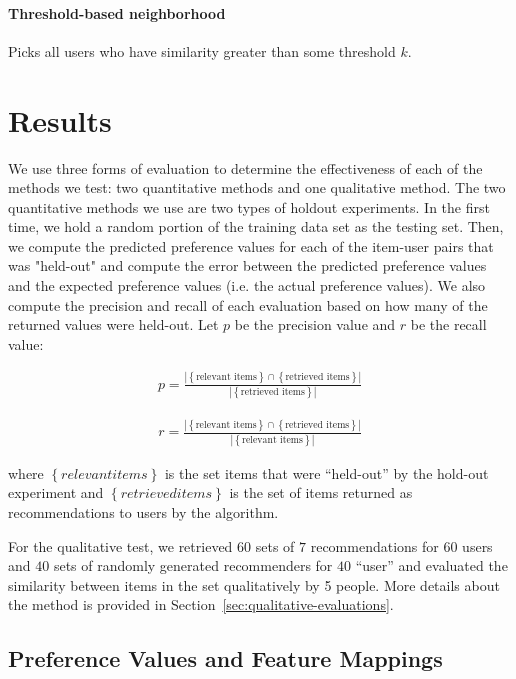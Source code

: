 \documentclass{article}
\begin{document}
\paragraph{Threshold-based neighborhood} Picks all users who have similarity greater than some threshold $k$. 

\section{Results}\label{sec:results}

We use three forms of evaluation to determine the effectiveness of each of the methods we test: two quantitative
methods and one qualitative method. The two quantitative methods we use are two types of holdout experiments.
In the first time, we hold a random portion of the training data set as the testing set. Then, we compute the 
predicted preference values for each of the item-user pairs that was "held-out" and compute the error between
the predicted preference values and the expected preference values (i.e. the actual preference values). We
also compute the precision and recall of each evaluation based on how many of the returned values
were held-out. Let $p$ be the precision value and $r$ be the recall value:

\begin{align*}
p = \frac{|\left\{ \text{relevant items} \right\} \cap \left\{\text{retrieved items}\right\}|}{|\left\{\text{retrieved items}\right\}|}
\end{align*}

\begin{align*}
r = \frac{|\left\{ \text{relevant items} \right\} \cap \left\{\text{retrieved items}\right\}|}{|\left\{\text{relevant items}\right\}|}
\end{align*} 

where $\left\{relevant items\right\}$ is the set items that were ``held-out'' by the hold-out experiment and $\left\{retrieved items\right\}$ is the set of items returned as recommendations to users by the algorithm.

For the qualitative test, we retrieved $60$ sets of $7$ recommendations for $60$ users and $40$ sets of randomly
generated recommenders for $40$ ``user'' and evaluated the similarity between items in the set qualitatively by 5 
people. More details about the method is provided in Section~\ref{sec:qualitative-evaluations}. 

\subsection{Preference Values and Feature Mappings}
\end{document}
